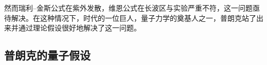 然而瑞利--金斯公式在紫外发散，维恩公式在长波区与实验严重不符，这一问题亟待解决。在这种情况下，时代的一位巨人，量子力学的奠基人之一，普朗克站了出来并通过理论假设很好地解决了这一问题。

\subsection{普朗克的量子假设}







